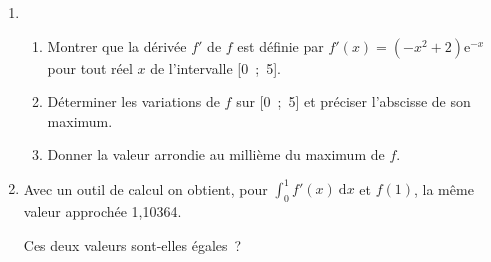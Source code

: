 \begin{enumerate}
     \item
     \begin{enumerate}[label=\alph*.]
          \item Montrer que la dérivée $f'$ de $f$ est définie par $f'(x) = \left(- x^2 + 2\right)\text{e}^{-x}$ pour tout réel $x$ de l'intervalle [0~;~5].
          \item Déterminer les variations de $f$ sur [0~;~5] et préciser l'abscisse de son maximum.
          \item Donner la valeur arrondie au millième du maximum de $f$.
     \end{enumerate}
     \item Avec un outil de calcul on obtient, pour $\displaystyle\int_0^1 f'(x)\:\text{d}x$ et $f(1)$, la même valeur approchée 1,10364.
     \par
     Ces deux valeurs sont-elles égales~?
\end{enumerate}
